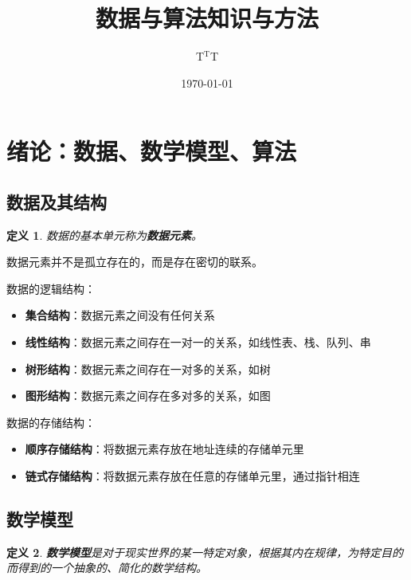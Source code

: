 \documentclass[10pt, a4paper, oneside, fontset=none]{ctexart}
\title
{
	\textbf{数据与算法}{\kai 知识与方法}
}
\author{\zihao{5} T$^\text{T}$T}
\date{\zihao{5}\kai \today}
\theoremstyle{plain}
\newtheorem{definition}{定义}[section]
\theoremstyle{definition}
\newcommand{\tboba}[1]{\textbf{\kai\color{bali!75!black}#1}}
\begin{document}
\maketitle
\begin{multicols}{2}
	\begin{flushleft}
		\tableofcontents
	\end{flushleft}
\end{multicols}

\newpage
\setcounter{section}{-1}
\section{绪论：数据、数学模型、算法}

\subsection{数据及其结构}

\begin{definition}
    数据的基本单元称为\tboba{数据元素}。
\end{definition}

数据元素并不是孤立存在的，而是存在密切的联系。

数据的逻辑结构：
\begin{itemize}
    \item \tboba{集合结构}：数据元素之间没有任何关系
    \item \tboba{线性结构}：数据元素之间存在一对一的关系，如线性表、栈、队列、串
    \item \tboba{树形结构}：数据元素之间存在一对多的关系，如树
    \item \tboba{图形结构}：数据元素之间存在多对多的关系，如图
\end{itemize}

数据的存储结构：
\begin{itemize}
    \item \tboba{顺序存储结构}：将数据元素存放在地址连续的存储单元里
    \item \tboba{链式存储结构}：将数据元素存放在任意的存储单元里，通过指针相连
\end{itemize}

\subsection{数学模型}

\begin{definition}
    \tboba{数学模型}是对于现实世界的某一特定对象，根据其内在规律，为特定目的而得到的一个抽象的、简化的数学结构。
\end{definition}
\end{document}
